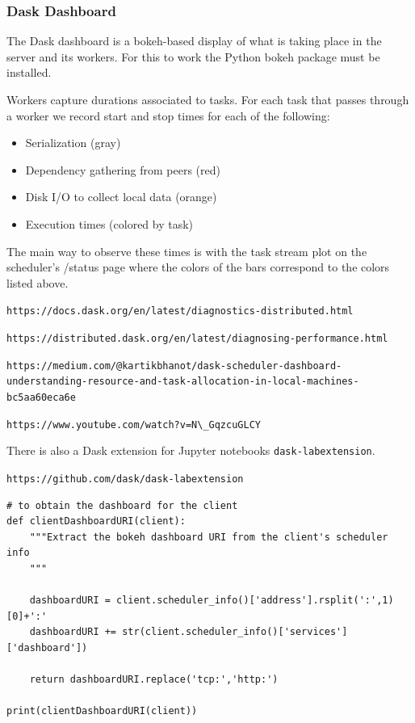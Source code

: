 \subsubsection{Dask Dashboard}
\label{sec:DaskDashboard}

The Dask dashboard is a bokeh-based display of what is taking place in the server and its workers. For this to work the Python bokeh package must be installed.


Workers capture durations associated to tasks. For each task that passes through a worker we record start and stop times for each of the following:


\begin{itemize}
\item Serialization (gray)
\item Dependency gathering from peers (red)
\item Disk I/O to collect local data (orange)
\item Execution times (colored by task)
\end{itemize}

The main way to observe these times is with the task stream plot on the scheduler's /status page where the colors of the bars correspond to the colors listed above.


\lstinline{https://docs.dask.org/en/latest/diagnostics-distributed.html}


\lstinline{https://distributed.dask.org/en/latest/diagnosing-performance.html}


\lstinline{https://medium.com/@kartikbhanot/dask-scheduler-dashboard-understanding-resource-and-task-allocation-in-local-machines-bc5aa60eca6e}


\lstinline{https://www.youtube.com/watch?v=N\_GqzcuGLCY}


There is also a Dask extension for Jupyter notebooks \verb+dask-labextension+.


\lstinline{https://github.com/dask/dask-labextension}



\begin{lstlisting}[style=incellstyle]
# to obtain the dashboard for the client
def clientDashboardURI(client):
    """Extract the bokeh dashboard URI from the client's scheduler info
    """
    
    dashboardURI = client.scheduler_info()['address'].rsplit(':',1)[0]+':'
    dashboardURI += str(client.scheduler_info()['services']['dashboard'])
    
    return dashboardURI.replace('tcp:','http:')

print(clientDashboardURI(client))
\end{lstlisting}


